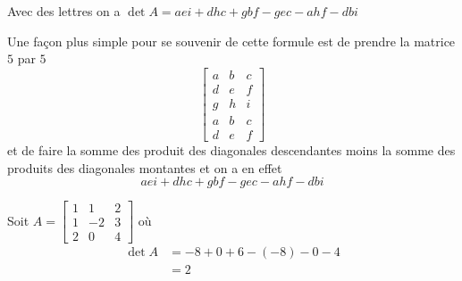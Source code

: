 \documentclass[11pt,colorlinks]{book}
\theoremstyle{mytheoremstyle}
\theoremstyle{mytheoremstyle}
\theoremstyle{mytheoremstyle}
\theoremstyle{mytheoremstyle}
\theoremstyle{mytheoremstyle}
\theoremstyle{mytheoremstyle}
\theoremstyle{mytheoremstyle}
\theoremstyle{mytheoremstyle}
\theoremstyle{myproblemstyle}
\begin{document}
\begin{rmq}
  Avec des lettres on a $\det A = aei + dhc + gbf - gec - ahf - dbi$
\end{rmq}
\begin{theorem}
  Une façon plus simple pour se souvenir de cette formule est de prendre la matrice $5$ par $5$ 
  \begin{equation*}
    \begin{bmatrix}
      a & b & c \\ 
      d & e & f \\ 
      g & h & i \\ 
      a & b & c \\ 
      d & e & f
    \end{bmatrix}
  \end{equation*}
  et de faire la somme des produit des diagonales descendantes moins la somme des produits des diagonales montantes et on a en effet 
  \begin{equation*}
    aei + dhc + gbf - gec - ahf - dbi
  \end{equation*}
\end{theorem}
\begin{ex}
  Soit $A = \begin{bmatrix}
    1 & 1 & 2 \\ 
    1 & -2 & 3 \\ 
    2 & 0 & 4
  \end{bmatrix}$
  où
  \begin{align*}
    \det A &= -8 + 0 + 6 - (-8) - 0 - 4 \\ 
    &= 2
  \end{align*}
\end{ex}
\end{document}
